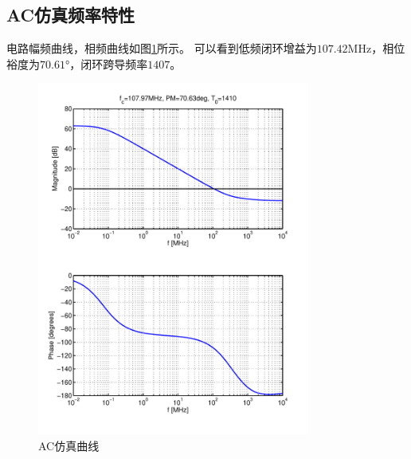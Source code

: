 \documentclass[a4paper]{article}
\newcommand{\uMHz}{\si{\mega\hertz}}
\newcommand{\udeg}{\si{\degree}}
\begin{document}
\subsection{AC仿真频率特性}
电路幅频曲线，相频曲线如图\ref{commonac}所示。
可以看到低频闭环增益为$107.42\uMHz$，相位裕度为$70.61\udeg$，闭环跨导频率$1407$。
\begin{figure}[htb]
    \begin{center}
        \includegraphics[width=0.8\textwidth]{common/ac.pdf}
    \end{center}
    \caption{AC仿真曲线}
    \label{commonac}
\end{figure}

\newpage
\clearpage
\end{document}

